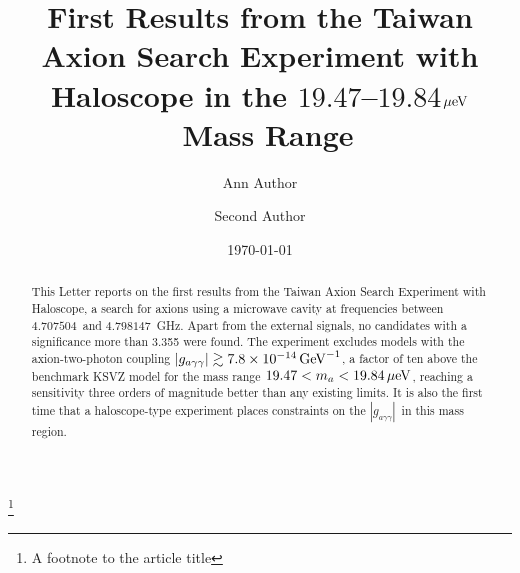 \documentclass[%
 reprint,prl, %
 amsmath,amssymb,
 aps,
]{revtex4-2}
\newcommand{\gagg}{\ensuremath{\left|g_{a\gamma\gamma}\right|}}
\newcommand{\ma}{\ensuremath{m_a}}
\newcommand{\muevcc}{\ensuremath{\,\mu\text{e\hspace{-.08em}V}}}
\newcommand{\GeVinv}{\ensuremath{\,\text{Ge\hspace{-.08em}V}^{-1}}}
\newcommand{\flo}{\ensuremath{4.707504}}
\newcommand{\fhi}{\ensuremath{4.798147}}
\newcommand{\mlo}{\ensuremath{19.47}}
\newcommand{\mhi}{\ensuremath{19.84}}
\newcommand{\avelimit}{\ensuremath{7.8\times 10^{-14}}}
\begin{document}

\title{First Results from the Taiwan Axion Search Experiment with Haloscope in the \mlo--\mhi\muevcc\ Mass Range}%
\thanks{A footnote to the article title}%

\author{Ann Author}
\author{Second Author}%
%



\date{\today}%

\begin{abstract}

 This Letter reports on the first results from the 
Taiwan Axion Search Experiment with Haloscope, a search for axions 
using a microwave cavity at frequencies between \flo\ and \fhi~GHz. 
Apart from the external signals, no candidates with 
a significance more than 3.355 were found. The experiment excludes 
models with the axion-two-photon 
coupling $\gagg\gtrsim \avelimit\GeVinv$, a factor of ten above the benchmark 
KSVZ model for the mass range $\mlo < \ma < \mhi \muevcc$, reaching 
a sensitivity three orders of magnitude better than any existing limits. 
 It is also the first time that a haloscope-type experiment places 
constraints on the \gagg\ in this mass region.



\end{abstract}

\maketitle
\end{document}
